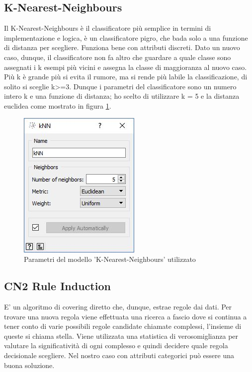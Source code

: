 \documentclass[a4paper, 12p]{report}
\begin{document}
	\subsection{K-Nearest-Neighbours}
	Il K-Nearest-Neighbours è il classificatore più semplice in termini di implementazione e logica, è un classificatore pigro, che bada solo a una funzione di distanza per scegliere. Funziona bene con attributi discreti.
Dato un nuovo caso, dunque, il classificatore non fa altro che guardare a quale classe sono assegnati i k esempi più vicini e assegna la classe di maggioranza al nuovo caso. Più k è grande più si evita il rumore, ma si rende più labile la classificazione, di solito si sceglie k>=3. Dunque i parametri del classificatore sono un numero intero k e una funzione di distanza; ho scelto di utilizzare k = 5 e la distanza euclidea come mostrato in figura \ref{fig:7}.
\begin{figure}	
	\centering
	\includegraphics[scale = 0.8]{img/Knn.JPG}
	\caption{Parametri del modello 'K-Nearest-Neighbours' utilizzato }\label{fig:7}
\end{figure}	
\subsection{CN2 Rule Induction}
E' un algoritmo di covering diretto che, dunque, estrae regole dai dati. Per trovare una nuova regola viene effettuata una ricerca a fascio dove si continua a tener conto di varie possibili regole candidate chiamate complessi, l'insieme di queste si chiama stella.
Viene utilizzata una statistica di verosomiglianza per valutare la significatività di ogni complesso e quindi decidere quale regola decisionale scegliere. Nel nostro caso con attributi categorici può essere una buona soluzione.
	
\end{document}
